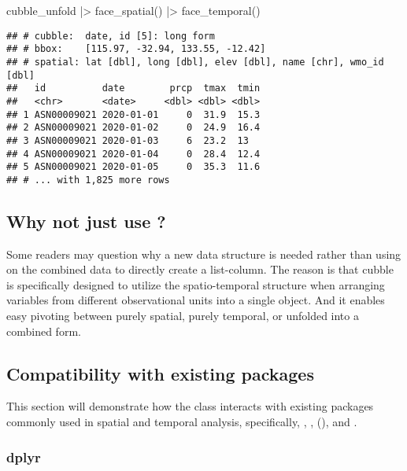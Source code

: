 \documentclass{article}
\newenvironment{Shaded}{\begin{snugshade}}{\end{snugshade}}
\newcommand{\FunctionTok}[1]{\textcolor[rgb]{0.00,0.00,0.00}{#1}}
\newcommand{\NormalTok}[1]{#1}
\newcommand{\SpecialCharTok}[1]{\textcolor[rgb]{0.00,0.00,0.00}{#1}}
\begin{document}
\begin{Shaded}
\begin{Highlighting}[]
\NormalTok{cubble\_unfold }\SpecialCharTok{|\textgreater{}} \FunctionTok{face\_spatial}\NormalTok{() }\SpecialCharTok{|\textgreater{}} \FunctionTok{face\_temporal}\NormalTok{()}
\end{Highlighting}
\end{Shaded}

\begin{verbatim}
## # cubble:  date, id [5]: long form
## # bbox:    [115.97, -32.94, 133.55, -12.42]
## # spatial: lat [dbl], long [dbl], elev [dbl], name [chr], wmo_id [dbl]
##   id          date        prcp  tmax  tmin
##   <chr>       <date>     <dbl> <dbl> <dbl>
## 1 ASN00009021 2020-01-01     0  31.9  15.3
## 2 ASN00009021 2020-01-02     0  24.9  16.4
## 3 ASN00009021 2020-01-03     6  23.2  13  
## 4 ASN00009021 2020-01-04     0  28.4  12.4
## 5 ASN00009021 2020-01-05     0  35.3  11.6
## # ... with 1,825 more rows
\end{verbatim}

\subsection[Why not just use]{Why not just use ?}

Some readers may question why a new data structure is needed rather than using  on the combined data to directly create a list-column. The reason is that cubble is specifically designed to utilize the spatio-temporal structure when arranging variables from different observational units into a single object. And it enables easy pivoting between purely spatial, purely temporal, or unfolded into a combined form.

\hypertarget{compact}{%
\subsection{Compatibility with existing packages}\label{compact}}

This section will demonstrate how the  class interacts with existing packages commonly used in spatial and temporal analysis, specifically, , ,  (), and .

\hypertarget{dplyr}{%
\subsubsection{dplyr}\label{dplyr}}
\end{document}
